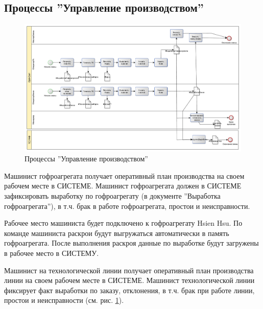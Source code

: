 \subsection{Процессы ''Управление производством''}
%
\begin{figure}
\begin{center}
  \includegraphics[angle=90, height=0.9\textheight, keepaspectratio]{Pics/4_Output.pdf}
\end{center}
  \caption{Процессы ''Управление производством''}
  \label{pic:Schema_4}
\end{figure}




 Машинист гофроагрегата получает оперативный план производства на своем рабочем месте в СИСТЕМЕ. Машинист гофроагрегата должен в СИСТЕМЕ зафиксировать выработку по гофроагрегату (в документе ''Выработка гофроагрегата''), в т.ч. брак в работе гофроагрегата, простои и неисправности.

Рабочее место машиниста будет подключено к гофроагрегату Hsien Hsu. По команде машиниста раскрои будут выгружаться автоматически в память гофроагрегата.
После выполнения раскроя данные по выработке будут загружены в рабочее место в СИСТЕМУ.

Машинист на технологической линии получает оперативный план производства линии на своем рабочем месте в СИСТЕМЕ. Машинист технологической линии фиксирует факт выработки по заказу, отклонения, в т.ч. брак при работе линии, простои и неисправности (см. рис. \ref{pic:Schema_4}).




